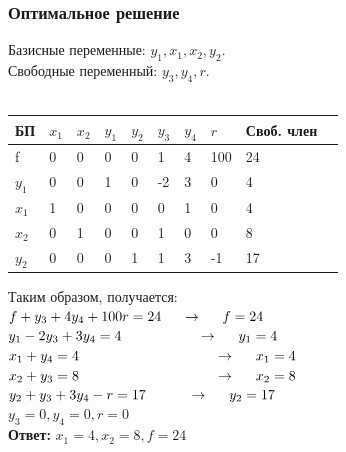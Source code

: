 \documentclass[14pt,a4paper,fleqn]{extarticle}
\begin{document}
\subsubsection*{Оптимальное решение}
Базисные переменные: $y_1, x_1, x_2, y_2$.\\
Свободные переменный: $y_3, y_4, r$.\\\\
\begin{tabularx}{\textwidth}{|p{1cm}|p{1cm}|p{1cm}|p{1cm}|p{1cm}|p{1cm}|p{1cm}|p{1cm}|p{1.2cm}|c}
	\hline
	БП & $x_1$ & $x_2$ & $y_1$ & $y_2$ & $y_3$ & $y_4$ & $r$ & Своб. член & \\
	\hline
	f & 0 & 0 & 0 & 0 & 1 & 4 & 100 & 24 & \\
	\hline
	$y_1$ & 0 & 0 & 1 & 0 & -2 & 3 & 0 & 4 & \\
	\hline
	$x_1$ & 1 & 0 & 0 & 0 & 0 & 1 & 0 & 4\\
	\hline
	$x_2$ & 0 & 1 & 0 & 0 & 1 & 0 & 0 & 8 \\
	\hline
	$y_2$ & 0 & 0 & 0 & 1 & 1 & 3 & -1 & 17\\
	\hline
\end{tabularx}
\newline\newline
Таким образом, получается:\\
$f + y_3 + 4y_4 + 100r = 24 \hspace*{0.5cm} \rightarrow \hspace*{0.5cm} f = 24$\\
$y_1 - 2y_3 + 3y_4 = 4 \hspace*{1.9cm} \rightarrow \hspace*{0.5cm} y_1 = 4$\\
$x_1 + y_4 = 4 \hspace*{3.4cm} \rightarrow \hspace*{0.5cm} x_1 = 4$\\
$x_2 + y_3 = 8 \hspace*{3.4cm} \rightarrow \hspace*{0.5cm} x_2 = 8$\\
$y_2 + y_3 + 3y_4 - r = 17 \hspace*{1.05cm} \rightarrow \hspace*{0.5cm} y_2 = 17$\\
$y_3 = 0, y_4 = 0, r = 0$\\
\textbf{Ответ:} $x_1 = 4, x_2 = 8, f = 24$
\end{document}
